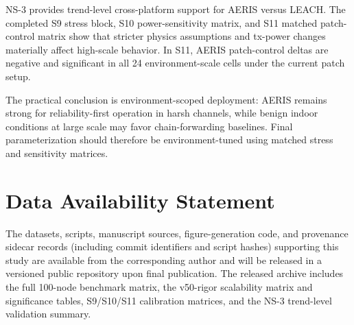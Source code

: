 ﻿\documentclass[sensors,article,submit,moreauthors,pdftex]{Definitions/mdpi}
\begin{document}
NS-3 provides trend-level cross-platform support for AERIS versus LEACH. The completed S9 stress block, S10 power-sensitivity matrix, and S11 matched patch-control matrix show that stricter physics assumptions and tx-power changes materially affect high-scale behavior. In S11, AERIS patch-control deltas are negative and significant in all 24 environment-scale cells under the current patch setup.

The practical conclusion is environment-scoped deployment: AERIS remains strong for reliability-first operation in harsh channels, while benign indoor conditions at large scale may favor chain-forwarding baselines. Final parameterization should therefore be environment-tuned using matched stress and sensitivity matrices.

\section*{Data Availability Statement}
The datasets, scripts, manuscript sources, figure-generation code, and provenance sidecar records (including commit identifiers and script hashes) supporting this study are available from the corresponding author and will be released in a versioned public repository upon final publication. The released archive includes the full 100-node benchmark matrix, the v50-rigor scalability matrix and significance tables, S9/S10/S11 calibration matrices, and the NS-3 trend-level validation summary.


\end{document}
